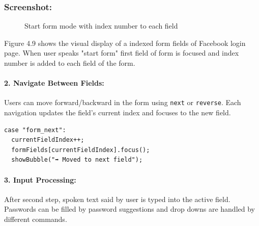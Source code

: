 \subsubsection*{Screenshot:}
\begin{figure}[H] 
    \centering
    \caption{Start form mode with index number to each field}
    \label{fig:start_form}
\end{figure}

Figure 4.9 shows the visual display of a indexed form fields of Facebook login page. When user speaks "start form" first field of form is focused and index number is added to each field of the form. 

\paragraph{2. Navigate Between Fields:}
Users can move forward/backward in the form using \texttt{next} or \texttt{reverse}. Each navigation updates the field's current index and focuses to the new field.

\begin{verbatim}
case "form_next":
  currentFieldIndex++;
  formFields[currentFieldIndex].focus();
  showBubble("➡️ Moved to next field");
\end{verbatim}

\paragraph{3. Input Processing:}
After second step, spoken text said by user is typed into the active field. Passwords can be filled by password suggestions and drop downs are handled by different commands.


